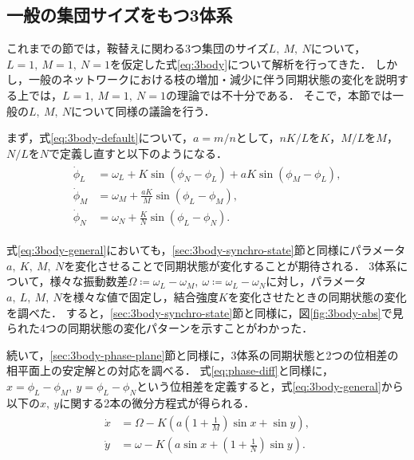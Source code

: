 \documentclass[../main]{subfiles}
\begin{document}
\subsection{一般の集団サイズをもつ3体系}
\label{sec:3body-general}
これまでの節では，鞍替えに関わる3つ集団のサイズ$L,\ M,\ N$について，$L=1,\ M=1,\ N=1$を仮定した式\eqref{eq:3body}について解析を行ってきた．
しかし，一般のネットワークにおける枝の増加・減少に伴う同期状態の変化を説明する上では，$L=1,\ M=1,\ N=1$の理論では不十分である．
そこで，本節では一般の$L,\ M,\ N$について同様の議論を行う．

まず，式\eqref{eq:3body-default}について，$a=m/n$として，$nK/L$を$K$，$M/L$を$M$，$N/L$を$N$で定義し直すと以下のようになる．
\begin{align}
    \label{eq:3body-general}
    \begin{split}
        \dot{\phi}_L&=\omega_L+K\sin\left( \phi_N-\phi_L \right)+aK\sin\left( \phi_M-\phi_L \right),\\
        \dot{\phi}_M&=\omega_M+\frac{aK}{M}\sin\left( \phi_L-\phi_M \right), \\
        \dot{\phi}_N&=\omega_N+\frac{K}{N}\sin\left( \phi_L-\phi_N \right).    
    \end{split}
\end{align}

式\eqref{eq:3body-general}においても，\ref{sec:3body-synchro-state}節と同様にパラメータ$a,\ K,\ M,\ N$を変化させることで同期状態が変化することが期待される．
3体系について，様々な振動数差$\Omega\coloneqq\omega_L-\omega_M,\ \omega\coloneqq\omega_L-\omega_N$に対し，パラメータ$a,\ L,\ M,\ N$を様々な値で固定し，結合強度$K$を変化させたときの同期状態の変化を調べた．
すると，\ref{sec:3body-synchro-state}節と同様に，図\ref{fig:3body-abs}で見られた4つの同期状態の変化パターンを示すことがわかった．

続いて，\ref{sec:3body-phase-plane}節と同様に，3体系の同期状態と2つの位相差の相平面上の安定解との対応を調べる．
式\eqref{eq:phase-diff}と同様に，$x=\phi_L-\phi_M,\ y=\phi_L-\phi_N$という位相差を定義すると，式\eqref{eq:3body-general}から以下の$x,\ y$に関する2本の微分方程式が得られる．
\begin{align}
    \label{eq:phase-diff-general}
    \begin{split}
        \dot{x}&=\Omega-K\left( a\left(1+\frac{1}{M}\right)\sin x +\sin y\right),\\
        \dot{y}&=\omega-K\left( a\sin x +\left(1+\frac{1}{N}\right)\sin y\right).
    \end{split}
\end{align}
\end{document}
